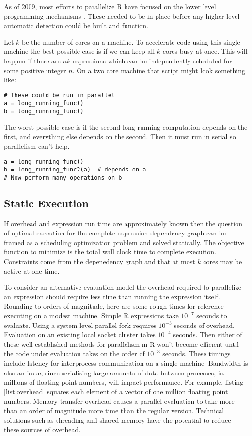 \documentclass[12pt]{article}
\begin{document}
As of 2009, most efforts to parallelize R have focused on the lower level
programming mechanisms \cite{schmidberger2009state}. These needed to be in
place before any higher level automatic detection could be built and
function.

Let $k$ be the number of cores on a machine.
To accelerate code using this single machine the best possible case is if
we can keep all $k$ cores busy at once. This will happen if there are $nk$
expressions which can be independently scheduled for some positive integer
$n$. 
On a two core machine that script might look something like:

\begin{verbatim}
# These could be run in parallel
a = long_running_func()
b = long_running_func()
\end{verbatim}

The worst possible case is if the second long running computation depends
on the first, and everything else depends on the second. Then it must run
in serial so parallelism can't help.

\begin{verbatim}
a = long_running_func()
b = long_running_func2(a)  # depends on a
# Now perform many operations on b
\end{verbatim}

\subsection{Static Execution}

If overhead and expression run time are approximately known then the
question of optimal execution for the complete expression dependency graph
can be framed as a scheduling optimization problem and solved statically.
The objective function to minimize is the total wall clock time to complete
execution. Constraints come from the depenedency graph and that at most $k$
cores may be active at one time.

To consider an alternative evaluation model the overhead required to
parallelize an expression should require less time than running the
expression itself. Rounding to orders of magnitude, here are some rough
times for reference executing on a modest machine. Simple R expressions
take $10^{-7}$ seconds to evaluate. Using a system level parallel fork
requires $10^{-3}$ seconds of overhead. Evaluation on an existing local
socket cluster takes $10^{-4}$ seconds. Then either of these well
established methods for parallelism in R won't become efficient until the
code under evaluation takes on the order of $10^{-3}$ seconds.
These timings include latency for interprocess communication on a single
machine. Bandwidth is also an issue, since serializing large amounts of
data between processes, ie. millions of floating point numbers, will impact
performance. For example, listing \ref{list:overhead} squares each element
of a vector of one million floating point numbers. Memory transfer overhead causes
a parallel evaluation to take more than an order of magnitude more time
than the regular version. 
Technical solutions such as threading and shared memory have the
potential to reduce these sources of overhead.
\end{document}
